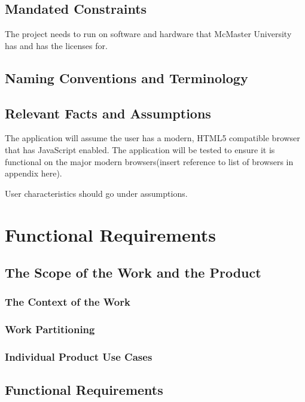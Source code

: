 \documentclass[12pt, titlepage]{article}
\begin{document}
  \subsection{Mandated Constraints}
  The project needs to run on software and hardware that McMaster University
  has and has the licenses for.

  \subsection{Naming Conventions and Terminology}

  \subsection{Relevant Facts and Assumptions}
  The application will assume the user has a modern, HTML5 compatible browser
  that has JavaScript enabled. The application will be tested to ensure it is
  functional on the major modern browsers(insert reference to list of browsers
  in appendix here).

  User characteristics should go under assumptions.

\section{Functional Requirements}

  \subsection{The Scope of the Work and the Product}

    \subsubsection{The Context of the Work}

    \subsubsection{Work Partitioning}

    \subsubsection{Individual Product Use Cases}

  \subsection{Functional Requirements}
\end{document}
